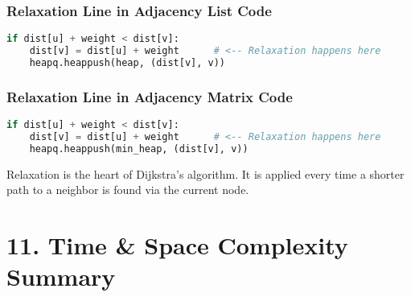 \documentclass[14pt]{extarticle}
\begin{document}
\vspace{0.5cm}

\subsubsection*{Relaxation Line in Adjacency List Code}
\begin{lstlisting}[language=Python]
if dist[u] + weight < dist[v]:
    dist[v] = dist[u] + weight      # <-- Relaxation happens here
    heapq.heappush(heap, (dist[v], v))
\end{lstlisting}

\vspace{1cm}

\subsubsection*{Relaxation Line in Adjacency Matrix Code}
\begin{lstlisting}[language=Python]
if dist[u] + weight < dist[v]:
    dist[v] = dist[u] + weight      # <-- Relaxation happens here
    heapq.heappush(min_heap, (dist[v], v))
\end{lstlisting}

\vspace{0.5cm}

\begin{tcolorbox}[colback=white, colframe=black, title=Note]
Relaxation is the heart of Dijkstra’s algorithm. It is applied every time a shorter path to a neighbor is found via the current node.
\end{tcolorbox}


\section*{11. Time \& Space Complexity Summary}
\end{document}
